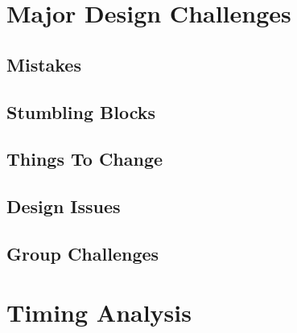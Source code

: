 \documentclass[se]{uw-wkrpt}
\begin{document}
\section{Major Design Challenges}\label{sec:design}

\subsection{Mistakes}

\subsection{Stumbling Blocks}

\subsection{Things To Change}

\subsection{Design Issues}

\subsection{Group Challenges}

\section{Timing Analysis}\label{sec:time}
\end{document}
